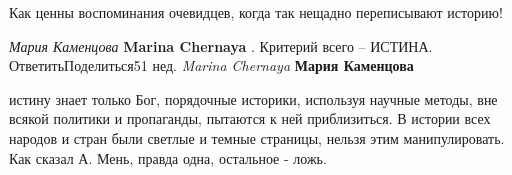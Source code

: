 \begin{itemize}
Как ценны воспоминания очевидцев, когда так нещадно переписывают историю!

\begin{itemize} %
\emph{Мария Каменцова}
\textbf{Marina Chernaya} . Критерий всего – ИСТИНА.
ОтветитьПоделиться51 нед.
\emph{Marina Chernaya}
\textbf{Мария Каменцова} 

истину знает только Бог, порядочные историки, используя научные методы, вне
всякой политики и пропаганды, пытаются к ней приблизиться. В истории всех
народов и стран были светлые и темные страницы, нельзя этим манипулировать. Как
сказал А. Мень, правда одна, остальное - ложь.

\end{itemize} %

\end{itemize} %
